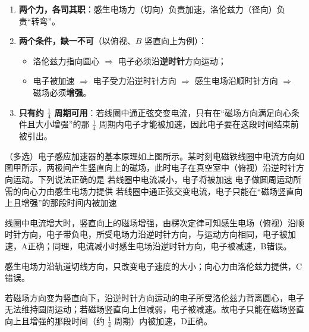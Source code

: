 \begin{fangfa}[电子感应加速器问题的分析要点]
\begin{enumerate}[label=（\arabic*）,leftmargin=2.4em]
  \item \textbf{两个力，各司其职}：感生电场力（切向）负责加速，洛伦兹力（径向）负责“转弯”。
  \item \textbf{两个条件，缺一不可}（以俯视、$B$ 竖直向上为例）：
  \begin{itemize}[leftmargin=1.2em,label=\textbullet]
    \item 洛伦兹力指向圆心 $\Rightarrow$ 电子必须沿\textbf{逆时针}方向运动；
    \item 电子被加速 $\Rightarrow$ 电子受力沿逆时针方向 $\Rightarrow$ 感生电场沿顺时针方向 $\Rightarrow$ 磁场必须\textbf{增强}。
  \end{itemize}
  \item \textbf{只有约 $\tfrac14$ 周期可用}：若线圈中通正弦交变电流，只有在“磁场方向满足向心条件且大小增强”的那 $\tfrac14$ 周期内电子才能被加速，因此电子要在这段时间结束前被引出。
\end{enumerate}
\end{fangfa}

\begin{liti}
（多选）电子感应加速器的基本原理如上图所示。某时刻电磁铁线圈中电流方向如图甲所示，两极间产生竖直向上的磁场，此时电子在真空室中（俯视）沿逆时针方向运动。下列说法正确的是
%
{若线圈中电流减小，电子将被加速}%
{电子做圆周运动所需的向心力由感生电场力提供}%
{若线圈中通正弦交变电流，电子只能在“磁场竖直向上且增强”的那段时间内被加速}
\begin{jiexi}[2.5cm]
线圈中电流增大时，竖直向上的磁场增强，由楞次定律可知感生电场（俯视）沿顺时针方向，电子带负电，所受电场力沿逆时针方向，与运动方向相同，电子被加速，A正确；同理，电流减小时感生电场沿逆时针方向，电子被减速，B错误。

感生电场力沿轨道切线方向，只改变电子速度的大小；向心力由洛伦兹力提供，C错误。

若磁场方向变为竖直向下，沿逆时针方向运动的电子所受洛伦兹力背离圆心，电子无法维持圆周运动；若磁场竖直向上但减弱，电子被减速。故电子只能在磁场竖直向上且增强的那段时间（约 $\tfrac14$ 周期）内被加速，D正确。
\end{jiexi}
\end{liti}

